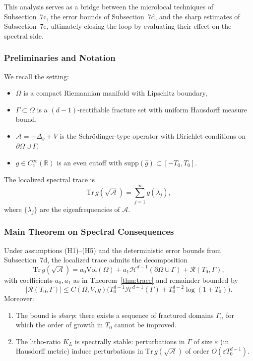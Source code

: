 This analysis serves as a bridge between the microlocal techniques of 
Subsection~7c, the error bounds of Subsection~7d, and the sharp estimates 
of Subsection~7e, ultimately closing the loop by evaluating their effect 
on the spectral side.

\subsubsection*{Preliminaries and Notation}
We recall the setting:
\begin{itemize}
\item $\Omega$ is a compact Riemannian manifold with Lipschitz boundary,
\item $\Gamma \subset \Omega$ is a $(d-1)$-rectifiable fracture set 
with uniform Hausdorff measure bound,
\item $\mathcal{A} = -\Delta_g + V$ is the Schrödinger-type operator 
with Dirichlet conditions on $\partial \Omega \cup \Gamma$,
\item $g \in C^\infty_c(\mathbb{R})$ is an even cutoff with 
$\mathrm{supp}(\widehat g) \subset [-T_0, T_0]$.
\end{itemize}

The localized spectral trace is
\[
\mathrm{Tr}\, g(\sqrt{\mathcal{A}}) 
= \sum_{j=1}^\infty g(\lambda_j),
\]
where $\{\lambda_j\}$ are the eigenfrequencies of $\mathcal{A}$.

\subsubsection*{Main Theorem on Spectral Consequences}
\begin{theorem}
\label{thm:trace-error-consequence}
Under assumptions (H1)–(H5) and the deterministic error bounds from 
Subsection~7d, the localized trace admits the decomposition
\[
\mathrm{Tr}\, g(\sqrt{\mathcal{A}}) 
= a_0 \mathrm{Vol}(\Omega) 
+ a_1 \mathcal{H}^{d-1}(\partial \Omega \cup \Gamma) 
+ \mathcal{R}(T_0,\Gamma),
\]
with coefficients $a_0,a_1$ as in Theorem~\ref{thm:trace} 
and remainder bounded by
\[
|\mathcal{R}(T_0,\Gamma)| 
\leq C(\Omega,V,g) \Big( 
T_0^{d-1}\mathcal{H}^{d-1}(\Gamma) 
+ T_0^{d-2}\log(1+T_0) 
\Big).
\]
Moreover:
\begin{enumerate}[label=(\alph*)]
\item The bound is \emph{sharp}: there exists a sequence of 
fractured domains $\Gamma_n$ for which the order of growth in 
$T_0$ cannot be improved.
\item The litho-ratio $K_L$ is spectrally stable: perturbations 
in $\Gamma$ of size $\varepsilon$ (in Hausdorff metric) induce 
perturbations in $\mathrm{Tr}\, g(\sqrt{\mathcal{A}})$ of order 
$O(\varepsilon T_0^{d-1})$.
\end{enumerate}
\end{theorem}

